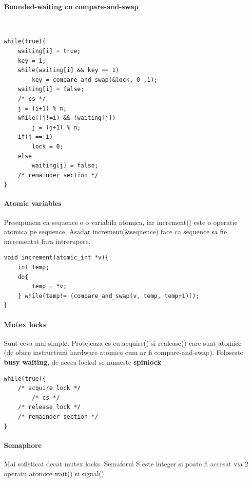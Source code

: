 \documentclass{article}
\begin{document}
\paragraph*{Bounded-waiting cu compare-and-swap}\
\begin{lstlisting}
while(true){
    waiting[i] = true;
    key = 1;
    while(waiting[i] && key == 1)
        key = compare_and_swap(&lock, 0 ,1);
    waiting[i] = false;
    /* cs */
    j = (i+1) % n;
    while((j!=i) && !waiting[j])
        j = (j+1) % n;
    if(j == i)
        lock = 0;
    else
        waiting[j] = false;
    /* remainder section */
}
\end{lstlisting}

\paragraph*{Atomic variables}
Presupunem ca sequence e o variabila atomica, iar increment() este o operatie atomica pe sequence. Asadar increment(\&sequence) face ca sequence sa fie incrementat fara intrerupere.

\begin{center}
    \begin{lstlisting}
void increment(atomic_int *v){
    int temp;
    do{
        temp = *v;
    } while(temp!= (compare_and_swap(v, temp, temp+1)));
}
    \end{lstlisting}
\end{center}

\paragraph*{Mutex locks} Sunt ceva mai simple. Protejeaza cs cu acquire() si realease() care sunt atomice (de obice instructiuni hardware atomice cum ar fi compare-and-swap). Foloseste \textbf{busy waiting}, de aceea lockul se numeste \textbf{spinlock}

\begin{center}
    \begin{lstlisting}
while(true){
    /* acquire lock */
        /* cs */
    /* release lock */
    /* remainder section */
}
    \end{lstlisting}
\end{center}

\paragraph*{Semaphore} Mai sofisticat decat mutex locks. Semaforul S este integer si poate fi accesat via 2 operatii atomice wait() si signal()
\end{document}
